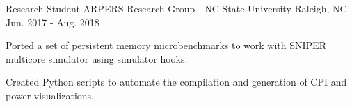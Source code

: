 \par\addvspace{0ex}


\begin{cventries}

  \cventry
    {Research Student} %
    {ARPERS Research Group - NC State University} %
    {Raleigh, NC} %
    {\color{darkgray}Jun. 2017 - Aug. 2018} %
    {
      \begin{cvitems} %
        \item {Ported a set of persistent memory microbenchmarks to work with SNIPER multicore simulator using simulator hooks.}
        \item {Created Python scripts to automate the compilation and generation of CPI and power visualizations. }
      \end{cvitems}
    }



\end{cventries}

